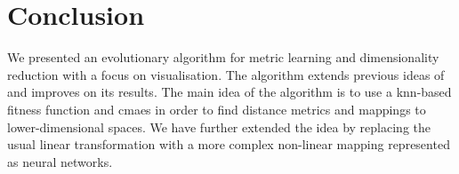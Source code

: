 \documentclass[12pt,a4paper]{report}
\begin{document}

%
%
%
%
%
%









\chapter{Conclusion} \label{chap:conclusion}

We presented an evolutionary algorithm for metric learning and dimensionality reduction with a focus on visualisation. The algorithm extends previous ideas of~\citep{fukui2013evolutionary} and improves on its results. The main idea of the algorithm is to use a \ac{knn}-based fitness function and \ac{cmaes} in order to find distance metrics and mappings to lower-dimensional spaces. We have further extended the idea by replacing the usual linear transformation with a more complex non-linear mapping represented as neural networks.
\end{document}
